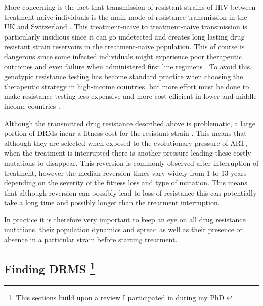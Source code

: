 \documentclass[
  11pt,
  twoside]{scrbook}
\begin{document}
More concerning is the fact that transmission of resistant strains of HIV between treatment-naive individuals is the main mode of resistance transmission in the UK \autocite{mouradPhylotypebasedAnalysisHighlights2015,hueDemonstrationSustainedDrugResistant2009} and Switzerland \autocite{drescherTreatmentNaiveIndividualsAre2014}. This treatment-naive to treatment-naive transmission is particularly insidious since it can go undetected and creates long lasting drug resistant strain reservoirs in the treatment-naive population. This of course is dangerous since some infected individuals might experience poor therapeutic outcomes and even failure when administered first line regimens \autocite{boermaHighLevelsPretreatment2016}. To avoid this, genotypic resistance testing has become standard practice when choosing the therapeutic strategy in high-income countries, but more effort must be done to make resistance testing less expensive and more cost-efficient in lower and middle income countries \autocite{clutterHIV1DrugResistance2016}.

Although the transmitted drug resistance described above is problematic, a large portion of DRMs incur a fitness cost for the resistant strain \autocite{kuhnertQuantifyingFitnessCost2018,mespledeViralFitnessCost2013}. This means that although they are selected when exposed to the evolutionary pressure of ART, when the treatment is interrupted there is another pressure leading these costly mutations to disappear. This reversion is commonly observed after interruption of treatment, however the median reversion times vary widely from 1 to 13 years \autocite{castroPersistenceHIV1Transmitted2013} depending on the severity of the fitness loss and type of mutation. This means that although reversion can possibly lead to loss of resistance this can potentially take a long time and possibly longer than the treatment interruption.

In practice it is therefore very important to keep an eye on all drug resistance mutations, their population dynamics and spread as well as their presence or absence in a particular strain before starting treatment.

\hypertarget{finding-drms}{%
\subsection[Finding DRMS ]{\texorpdfstring{Finding DRMS \footnote{This sections build upon a review I participated in during my PhD \autocite{blasselDrugResistanceMutations2021}}}{Finding DRMS }}\label{finding-drms}}
\end{document}
